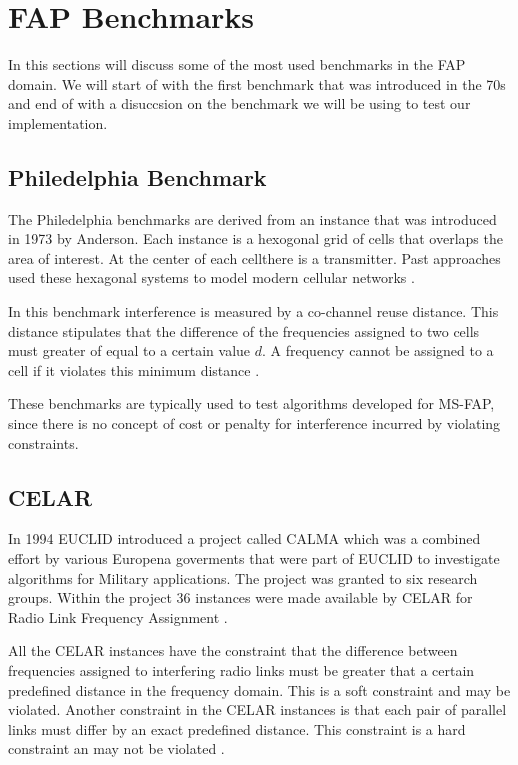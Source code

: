 \section{FAP Benchmarks}
\label{sec:FAPBenchmarks}
In this sections will discuss some of the most used benchmarks in the FAP domain. We will start of with the first benchmark that was introduced in the 70s and end of with a disuccsion on the benchmark we will be using to test our implementation.
\subsection{Philedelphia Benchmark}
The Philedelphia benchmarks are derived from an instance that was introduced in 1973 by Anderson. Each instance is a hexogonal grid of cells that overlaps the area of interest. At the center of each cellthere is a transmitter. Past approaches used these hexagonal systems to model modern cellular networks \cite{Karen2004,ExactMIFAP}.

In this benchmark interference is measured by a co-channel reuse distance. This distance stipulates that the difference of the frequencies  assigned to two cells must greater of equal to a certain value $d$. A frequency cannot be assigned to a cell if it violates this minimum distance \cite{Karen2004,ExactMIFAP}.

These benchmarks are typically used to test algorithms developed for MS-FAP, since there is no concept of cost or penalty for interference incurred by violating constraints.
\subsection{CELAR}
In 1994 EUCLID introduced a project called CALMA which was a combined effort by various Europena goverments that were part of EUCLID to investigate algorithms for Military applications. The project was granted to six research groups. Within the project 36 instances were made available by CELAR for Radio Link Frequency Assignment \cite{Karen2004,DynamicFAP}.

All the CELAR instances have the constraint that the difference between frequencies assigned to interfering radio links must be greater that a certain predefined distance in the frequency domain. This is a soft constraint and may be violated. Another constraint in the CELAR instances is that each pair of parallel links must differ by an exact predefined distance. This constraint is a hard constraint an may not be violated \cite{DynamicFAP}.


